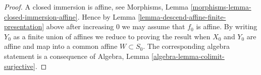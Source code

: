 \documentclass[10pt,a4paper]{amsart}
\theoremstyle{plain}
\theoremstyle{definition}
\theoremstyle{remark}
\numberwithin{equation}{subsection}
\begin{document}
\begin{proof}
A closed immersion is affine, see
Morphisms, Lemma \ref{morphisms-lemma-closed-immersion-affine}.
Hence by Lemma \ref{lemma-descend-affine-finite-presentation} above
after increasing $0$ we may assume that $f_0$ is affine.
By writing $Y_0$ as a finite union of affines we reduce to proving
the result when $X_0$ and $Y_0$ are affine and map
into a common affine $W \subset S_0$. The corresponding algebra
statement is a consequence of
Algebra, Lemma \ref{algebra-lemma-colimit-surjective}.
\end{proof}
\end{document}
